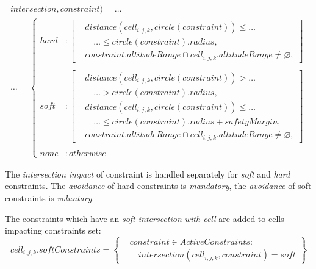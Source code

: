 \begin{multline}\label{eq:contraintToCellIntersection}
    intersection,constraint)=\dots\\\dots = 
    \begin{cases}
        hard &:\left[
            \begin{aligned}
                &distance(cell_{i,j,k},circle(constraint)) \le\dots\\ 
                &\quad\dots\le circle(constraint).radius,\\
                & constraint.altitude Range \cap cell_{i,j,k}.altitude Range \neq \varnothing,
            \end{aligned}\right]\\
             &\\
        soft &:\left[
            \begin{aligned}
                &distance(cell_{i,j,k},circle(constraint)) >\dots\\ 
                &\quad\dots > circle(constraint).radius,\\
                &distance(cell_{i,j,k},circle(constraint)) \le\dots\\ 
                &\quad\dots\le circle(constraint).radius + safety Margin,\\
                & constraint.altitude Range \cap cell_{i,j,k}.altitude Range \neq \varnothing,
            \end{aligned}\right]\\
             &\\
        none &:otherwise
    \end{cases}
\end{multline}

\noindent The \emph{intersection impact} of constraint is handled separately for \emph{soft} and  \emph{hard} constraints. The \emph{avoidance} of hard constraints is \emph{mandatory}, the \emph{avoidance} of soft constraints is \emph{voluntary}.

The constraints which have an \emph{soft intersection with cell} are added to cells impacting constraints set: 
\begin{equation}\label{eq:softConstraintsCellIntersections}
    cell_{i,j,k}. soft Constraints = 
    \left\{
        \begin{aligned}
            &constraint \in Active Constraints:\\ 
            &\quad intersection(cell_{i,j,k},constraint) = soft
        \end{aligned}
    \right\}
\end{equation}

